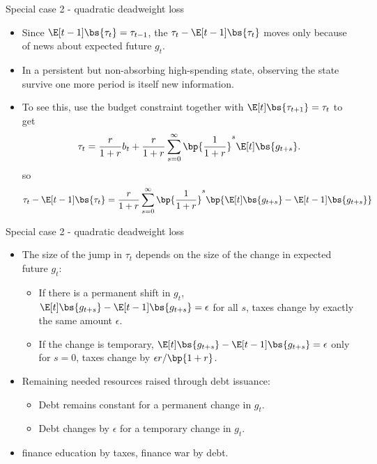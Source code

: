 \documentclass[11pt,xcolor={dvipsnames},aspectratio=159,hyperref={pdftex,pdfpagemode=UseNone,hidelinks,pdfdisplaydoctitle=true},usepdftitle=false]{beamer}
\begin{document}
    
    \begin{frame}{Special case 2 - quadratic deadweight loss}
    
    \begin{itemize}
    \item Since $\E[t-1]\bs{\tau_t} = \tau_{t-1}$, the  $\tau_t - \E[t-1]\bs{\tau_t}$ moves only because of news about expected future $g_t$.
    \item In a persistent but non-absorbing high-spending state, observing the state survive one more period is itself new information.
    \item To see this, use the budget constraint together with $\E[t]\bs{\tau_{t+1}} = \tau_t$ to get 
    \[ \tau_{t}=\frac{r}{1+r}b_{t}+\frac{r}{1+r}\sum_{s=0}^{\infty}\bp{\frac{1}{1+r}}^{s}\E[t]\bs{g_{t+s}}. \]
    so \[ \tau_t - \E[t-1]\bs{\tau_t} =\frac{r}{1+r}\sum_{s=0}^{\infty}\bp{\frac{1}{1+r}}^{s}\bp{\E[t]\bs{g_{t+s}}-\E[t-1]\bs{g_{t+s}}} \]
    \end{itemize}
    \end{frame}
    \begin{frame}{Special case 2 - quadratic deadweight loss}
    
    \begin{itemize}
    \item The size of the jump in $\tau_t$ depends on the size of the change in expected future $g_t$:
    \begin{itemize} 
        \item If there is a permanent shift in $g_t$, $\E[t]\bs{g_{t+s}}-\E[t-1]\bs{g_{t+s}}=\epsilon$ for all $s$, taxes change by exactly the same amount $\epsilon$.
        \item If the change is temporary, $\E[t]\bs{g_{t+s}}-\E[t-1]\bs{g_{t+s}}=\epsilon$ only for $s=0$, taxes change by $\epsilon r \slash \bp{1+r}$.
    \end{itemize}
    \item Remaining needed resources raised through debt issuance:
    \begin{itemize}
        \item Debt remains constant for a permanent change in $g_t$.
        \item Debt changes by $\epsilon$ for a temporary change in $g_t$.
    \end{itemize}

    \item {} finance education by taxes, finance war by debt.
    \end{itemize}
    \end{frame}
\end{document}
